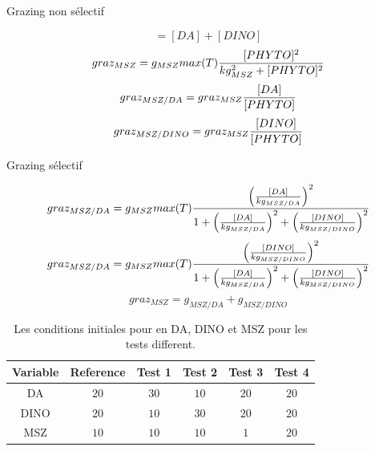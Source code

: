 \par{
Grazing non sélectif
}

\begin{equation}
  [PHYTO] = [DA] + [DINO]
  \label{eq:partie2nonSelEq1}
\end{equation}
\begin{equation}
  graz_{MSZ} = g_{MSZ} max(T) {{[PHYTO]^2}\over{kg_{MSZ}^2 + [PHYTO]^2}}
  \label{eq:partie2nonSelEq2}  
\end{equation}
\begin{equation}
  graz_{MSZ/DA} = graz_{MSZ} {{[DA]}\over{[PHYTO]}}
  \label{eq:partie2nonSelEq2}
\end{equation}
\begin{equation}
  graz_{MSZ/DINO} = graz_{MSZ} {{[DINO]}\over{[PHYTO]}}
  \label{eq:partie2nonSelEq3}
\end{equation}

\par{
Grazing sélectif
}

\begin{equation}
  graz_{MSZ/DA} = g_{MSZ} max(T) {{\left ( {{[DA]}\over{kg_{MSZ/DA}}}\right )^2}\over
{1 + \left ( {{[DA]}\over{kg_{MSZ/DA}}} \right )^2 + \left ( {{[DINO]}\over{kg_{MSZ/DINO}}} \right )^2}}
  \label{eq:partie2selEq1}
\end{equation}
\begin{equation}
  graz_{MSZ/DA} = g_{MSZ} max(T) {{\left ( {{[DINO]}\over{kg_{MSZ/DINO}}}\right )^2}\over
{1 + \left ( {{[DA]}\over{kg_{MSZ/DA}}} \right )^2 + \left ( {{[DINO]}\over{kg_{MSZ/DINO}}} \right )^2}}
  \label{eq:partie2selEq2}
\end{equation}
\begin{equation}
  graz_{MSZ} = g_{MSZ/DA} + g_{MSZ/DINO}
  \label{eq:partie2selEq3}
\end{equation}

\begin{table}
\begin{center}
\begin{tabular}{ | c | c | c | c | c | c | }
\hline
Variable & Reference & Test 1 & Test 2 & Test 3 & Test 4 \\
\hline
DA & $20$ & $30$ & $10$ & $20$ & $20$ \\
DINO & $20$ & $10$ & $30$ & $20$ & $20$ \\
MSZ & $10$ & $10$ & $10$ & $1$ & $20$ \\
\hline
\end{tabular}
\end{center}
  \caption{Les conditions initiales pour en DA, DINO et MSZ pour les tests different.}
  \label{tab:partie2params}
\end{table}

